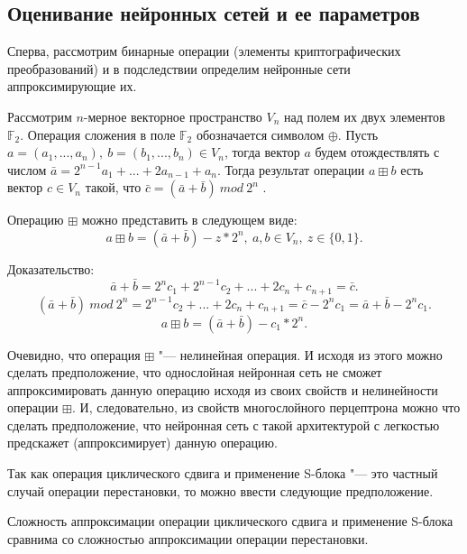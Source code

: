\bigskip
\subsection{Оценивание нейронных сетей и ее параметров}
\label{chapter1_section3}
Сперва, рассмотрим бинарные операции (элементы криптографических преобразований) и в подследствии определим нейронные сети аппроксимирующие их.
\bigskip

Рассмотрим $n$-мерное векторное пространство $V_n$ над полем их двух элементов $\mathbb{F}_2$. Операция сложения в поле  $\mathbb{F}_2$ обозначается символом $\oplus$. Пусть $a=(a_1, ..., a_n),\ b=(b_1,...,b_n)\in V_n$, тогда вектор $a$ будем отождествлять с числом $\bar{a} = 2^{n-1}a_1+...+2a_{n-1} + a_n$. Тогда результат операции $a \boxplus b$ есть вектор $c \in V_n$ такой, что $\bar{c}=(\bar{a} + \bar{b})\ mod\ 2^{n}$ \cite{practice}.

\begin{Lemma}
	Операцию $\boxplus$ можно представить в следующем виде:
\begin{equation}
a \boxplus b = (\bar{a} + \bar{b}) - z * 2^n,\ a, b \in V_n, \ z \in \{0, 1\}.
\label{f1}
\end{equation}

Доказательство:
\begin{equation*}
\bar{a} + \bar{b} =  2^{n} c_1 + 2^{n-1} c_2+...+2 c_{n} + c_{n+1} = \bar{c}.
\end{equation*}
\begin{equation*}
(\bar{a} + \bar{b})\ mod\ 2^{n} = 2^{n-1} c_2+...+2c_{n} + c_{n+1} = \bar{c} - 2^{n}c_1 = \bar{a} + \bar{b} - 2^{n}c_1.
\end{equation*}
\begin{equation*}
a \boxplus b = (\bar{a} + \bar{b}) - c_1 * 2^n.
\end{equation*}

\end{Lemma}

\bigskip
Очевидно, что операция $\boxplus$ "--- нелинейная операция. И исходя из этого можно сделать предположение, что однослойная нейронная сеть не сможет аппроксимировать данную операцию исходя из своих свойств и нелинейности операции $\boxplus$.
И, следовательно, из свойств многослойного перцептрона можно что сделать предположение, что нейронная сеть с такой архитектурой с легкостью предскажет (аппроксимирует) данную операцию.

\bigskip
Так как операция циклического сдвига и применение S-блока "--- это частный случай операции перестановки, то можно ввести следующие предположение.
\begin{Assumption}
	Сложность аппроксимации операции циклического сдвига и применение S-блока сравнима со сложностью аппроксимации операции перестановки.
\end{Assumption}

